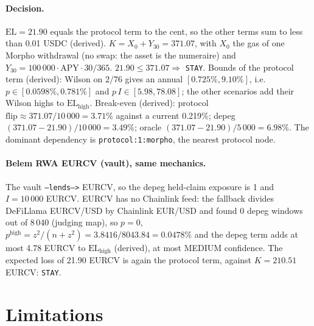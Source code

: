 \documentclass[11pt,a4paper]{article}
\newcommand{\code}[1]{\texttt{#1}}
\begin{document}
\paragraph{Decision.} $\mathrm{EL}=21.90$ equals the protocol term to the cent, so
the other terms sum to less than 0.01 USDC (derived). $K=X_0+Y_{30}=371.07$, with
$X_0$ the gas of one Morpho withdrawal (no swap: the asset is the numeraire) and
$Y_{30}=100\,000\cdot\text{APY}\cdot30/365$. $21.90\leq371.07\Rightarrow$
\code{STAY}. Bounds of the protocol term (derived): Wilson on $2/76$ gives an
annual $[0.725\%,9.10\%]$, i.e.\ $p\in[0.0598\%,0.781\%]$ and $p\,I\in[5.98,78.08]$;
the other scenarios add their Wilson highs to $\mathrm{EL}_{\text{high}}$.
Break-even (derived): protocol $\text{flip}\approx371.07/10\,000=3.71\%$ against a
current 0.219\%; depeg $(371.07-21.90)/10\,000=3.49\%$; oracle
$(371.07-21.90)/5\,000=6.98\%$. The dominant dependency is
\code{protocol:1:morpho}, the nearest protocol node.

\paragraph{Belem RWA EURCV (vault), same mechanics.} The vault
\code{--lends-->} EURCV, so the depeg held-claim exposure is 1 and $I=10\,000$
EURCV. EURCV has no Chainlink feed: the fallback divides DeFiLlama EURCV/USD by
Chainlink EUR/USD and found 0 depeg windows out of 8\,040 (judging map), so
$p=0$, $p^{\text{high}}=z^2/(n+z^2)=3.8416/8043.84=0.0478\%$ and the depeg term adds
at most 4.78 EURCV to $\mathrm{EL}_{\text{high}}$ (derived), at most MEDIUM
confidence. The expected loss of 21.90 EURCV is again the protocol term, against
$K=210.51$ EURCV: \code{STAY}.

\section{Limitations}
\end{document}
